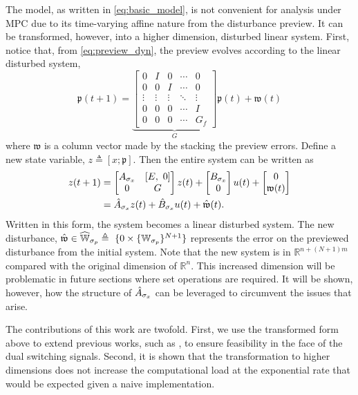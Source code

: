 The model, as written in \eqref{eq:basic_model}, is not convenient for analysis under MPC due to its time-varying affine nature from the disturbance preview. It can be transformed, however, into a higher dimension, disturbed linear system. First, notice that, from \eqref{eq:preview_dyn}, the preview evolves according to the linear disturbed system,
$$\mathfrak{p}(t+1)=\underbrace{\begin{bmatrix}
0 & I & 0 & \cdots & 0\\
0 & 0 & I & \cdots & 0\\
\vdots & \vdots & \vdots & \ddots & \vdots\\
0 & 0 & 0 & \cdots & I\\
0 & 0 & 0 & \cdots & G_f
\end{bmatrix}}_{G}\mathfrak{p}(t)+\mathfrak{w}(t)$$
where $\mathfrak{w}$ is a column vector made by the stacking the preview errors. Define a new state variable, $z\triangleq[x;\mathfrak{p}]$. Then the entire system can be written as
\begin{align}
    z(t+1) &= \begin{bmatrix}A_\ss{x} & [E,\ 0]\\0 & G\end{bmatrix}z(t)+\begin{bmatrix}B_\ss{x}\\0\end{bmatrix}u(t) + \begin{bmatrix}0 \\ \mathfrak{w}(t)\end{bmatrix}\nonumber\\
    &= \hat{A}_\ss{x}z(t)+\hat{B}_\ss{x}u(t)+\hat{\mathfrak{w}}(t)\label{eq:aug_model}.
\end{align}
Written in this form, the system becomes a linear disturbed system. The new disturbance, $\hat{\mathfrak{w}}\in\widehat{\mathbb{W}}_\ss{p}\triangleq\ \{0\times\{\mathbb{W}_\ss{p}\}^{N+1}\}$ represents the error on the previewed disturbance from the initial system. Note that the new system is in $\mathbb{R}^{n+(N+1)m}$ compared with the original dimension of $\mathbb{R}^n$. This increased dimension will be problematic in future sections where set operations are required. It will be shown, however, how the structure of $\hat{A}_\ss{x}$ can be leveraged to circumvent the issues that arise. 

The contributions of this work are twofold. First, we use the transformed form above to extend previous works, such as \cite{Lavaei2021}, to ensure feasibility in the face of the dual switching signals. Second, it is shown that the transformation to higher dimensions does not increase the computational load at the exponential rate that would be expected given a naive implementation.